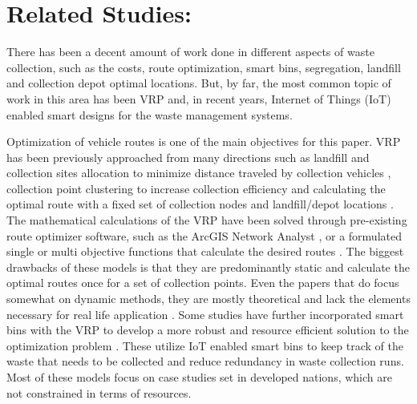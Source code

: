 \documentclass[12pt]{article}
\begin{document}
\section{Related Studies:}

There has been a decent amount of work done in different aspects of waste collection, such as the costs, route optimization, smart bins, segregation, landfill and collection depot optimal locations. But, by far, the most common topic of work in this area has been VRP and, in recent years, Internet of Things (IoT) enabled smart designs for the waste management systems. 

Optimization of vehicle routes is one of the main objectives for this paper. VRP has been previously approached from many directions such as landfill and collection sites allocation to minimize distance traveled by collection vehicles \cite{kulcar1996optimizing,rathore2020location,barzehkar2019landfill}, collection point clustering to increase collection efficiency \cite{al2021optimization} and calculating the optimal route with a fixed set of collection nodes and landfill/depot locations \cite{karadimas2008routing, amal2018sga, asefi2019mathematical,de2007decision, hannan2020waste,akhtar2017backtracking}. The mathematical calculations of the VRP have been solved through pre-existing route optimizer software, such as the ArcGIS Network Analyst \cite{karadimas2008routing,amal2018sga, malakahmad2014solid}, or a formulated single or multi objective functions that calculate the desired routes \cite{hannan2020waste,de2007decision}. The biggest drawbacks of these models is that they are predominantly static and calculate the optimal routes once for a set of collection points. Even the papers that do focus somewhat on dynamic methods, they are mostly theoretical and lack the elements necessary for real life application \cite{hannan2020waste}. Some studies have further incorporated smart bins with the VRP to develop a more robust and resource efficient solution to the optimization problem \cite{akhtar2017backtracking,lozano2018smart,baldo2021multi}. These utilize IoT enabled smart bins to keep track of the waste that needs to be collected and reduce redundancy in waste collection runs. Most of these models focus on case studies set in developed nations, which are not constrained in terms of resources.
\end{document}

